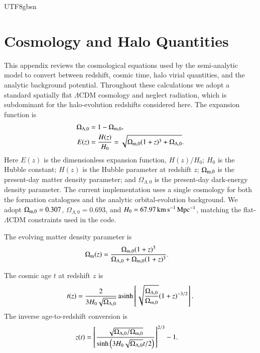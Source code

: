 \documentclass[trackchanges, twocolappendix, twocolumn]{aastex701}
\begin{document}
\begin{CJK*}{UTF8}{gbsn}
\appendix

\section{Cosmology and Halo Quantities}
\label{app:cosmology_equations}

This appendix reviews the cosmological equations used by the semi-analytic model to convert between redshift, cosmic time, halo virial quantities, and the analytic background potential. Throughout these calculations we adopt a standard spatially flat $\Lambda$CDM cosmology and neglect radiation, which is subdominant for the halo-evolution redshifts considered here. The expansion function is
\begin{align}
\Omega_{\Lambda ,0} & = 1 - \Omega_{\rm m, 0} ,\\
E(z) & = \dfrac{H (z)}{H_0} = \sqrt{\Omega_{\rm m, 0} (1 + z)^3 + \Omega_{\Lambda, 0}} .
\end{align}
Here $E(z)$ is the dimensionless expansion function, $H(z)/H_0$; $H_0$ is the Hubble constant; $H(z)$ is the Hubble parameter at redshift $z$; $\Omega_{\rm m,0}$ is the present-day matter density parameter; and $\Omega_{\Lambda,0}$ is the present-day dark-energy density parameter. The current implementation uses a single cosmology for both the formation catalogues and the analytic orbital-evolution background. We adopt $\Omega_{\rm m,0}=0.307$, $\Omega_{\Lambda,0}=0.693$, and $H_0=67.97\,{\rm km\,s^{-1}\,Mpc^{-1}}$, matching the \cite{DESIcollaboration2025} flat-$\Lambda$CDM constraints used in the code.

The evolving matter density parameter is
\begin{align}
\Omega_{\rm m}(z) &=
\dfrac{\Omega_{\rm m,0}(1+z)^3}
{\Omega_{\Lambda,0}+\Omega_{\rm m,0}(1+z)^3}.
\end{align}

The cosmic age $t$ at redshift $z$ is
\begin{align}
t(z) = \dfrac{2}{3 H_0 \sqrt{\Omega_{\Lambda,0}}} \operatorname{asinh} \left[ \sqrt{\dfrac{\Omega_{\Lambda,0}}{\Omega_{\rm m,0}}} (1 + z)^{-3/2} \right] .
\end{align}
The inverse age-to-redshift conversion is
\begin{align}
z(t) &= \left[ \dfrac{\sqrt{\Omega_{\Lambda, 0} / \Omega_{\rm m, 0}}}{\sinh \left( 3 H_0 \sqrt{\Omega_{\Lambda,0}} t / 2 \right)} \right]^{2/3} - 1 .
\end{align}


\end{CJK*}
\end{document}
